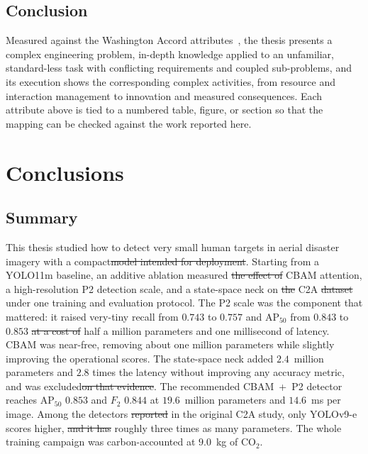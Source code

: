 \documentclass[12pt,a4paper,oneside]{report}
\providecommand{\DIFadd}[1]{{\protect\color{blue}\uwave{#1}}} %
\providecommand{\DIFdel}[1]{{\protect\color{red}\sout{#1}}}                      %
\providecommand{\DIFaddbegin}{} %
\providecommand{\DIFaddend}{} %
\providecommand{\DIFdelbegin}{} %
\providecommand{\DIFdelend}{} %
\begin{document}
\section{Conclusion}
Measured against the Washington Accord attributes~\cite{iea2021gapc}, the
thesis presents a complex engineering problem, in-depth knowledge applied to
an unfamiliar, standard-less task with conflicting requirements and coupled
sub-problems, and its execution shows the corresponding complex activities,
from resource and interaction management to innovation and measured
consequences. Each attribute above is tied to a numbered table, figure, or
section so that the mapping can be checked against the work reported here.
 \newpage 
 \newpage \chapter{Conclusions}

\section{Summary}
This thesis studied how to detect very small human targets in aerial disaster
imagery with a compact\DIFdelbegin \DIFdel{model intended for deployment}\DIFdelend \DIFaddbegin \DIFadd{, deployable model}\DIFaddend . Starting from a YOLO11m
baseline, an additive ablation measured \DIFdelbegin \DIFdel{the effect of }\DIFdelend CBAM attention, a high-resolution P2
detection scale, and a state-space neck on \DIFdelbegin \DIFdel{the }\DIFdelend C2A \DIFdelbegin \DIFdel{dataset
}\DIFdelend under one training and
evaluation protocol. The P2 scale was the component
that mattered: it raised very-tiny recall from $0.743$ to $0.757$ and
$\mathrm{AP}_{50}$ from $0.843$ to $0.853$ \DIFdelbegin \DIFdel{at a cost of }\DIFdelend \DIFaddbegin \DIFadd{for }\DIFaddend half a million
parameters and one millisecond of latency. CBAM was near-free, removing about
one million parameters while slightly improving the operational scores. The
state-space neck added $2.4$~million parameters and $2.8$ times the latency
without improving any accuracy metric, and was excluded\DIFdelbegin \DIFdel{on that evidence}\DIFdelend . The
recommended CBAM~+~P2 detector reaches $\mathrm{AP}_{50}$ $0.853$ and $F_2$
$0.844$ at $19.6$~million parameters and $14.6$~ms per image. Among the
detectors \DIFdelbegin \DIFdel{reported }\DIFdelend in the original C2A study, only YOLOv9-e scores higher, \DIFdelbegin \DIFdel{and
it has }\DIFdelend \DIFaddbegin \DIFadd{with
}\DIFaddend roughly three times as many parameters. The whole
training campaign was carbon-accounted at $9.0$~kg of CO$_2$.
\end{document}
